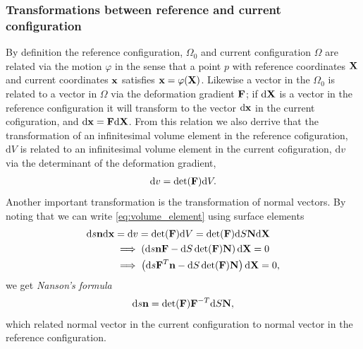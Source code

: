 \subsubsection{Transformations between reference and current
  configuration}
By definition the reference configuration, $\Omega_0$ and current
configuration $\Omega$ are related via the motion $\varphi$ in the
sense that a point $p$ with reference coordinates $\mathbf{X}$ and current
coordinates $\mathbf{x}$ satisfies $\mathbf{x} = \varphi(\mathbf{X})$. Likewise a
vector in the $\Omega_0$ is related to a vector in $\Omega$ via the
deformation gradient $\mathbf{F}$; if $\mathrm{d}\mathbf{X}$ is a vector in the
reference configuration it will transform to the vector
$\mathrm{d}\mathbf{x}$ in the current cofiguration, and $\mathrm{d}\mathbf{x} =
\mathbf{F} \mathrm{d}\mathbf{X}$. From this relation we also derrive that the
transformation of an infinitesimal volume element in the reference
cofiguration, $\mathrm{d}V$ is related to an infinitesimal volume
element in the current cofiguration, $\mathrm{d}v$  via the determinant of the
deformation gradient,
\begin{align}
  \mathrm{d}v =\det(\mathbf{F}) \mathrm{d}V.
  \label{eq:volume_element}
\end{align}
Another important transformation is the transformation of normal
vectors. By noting that we can write \eqref{eq:volume_element} using
surface elements
\begin{align*}
  \mathrm{d}s \mathbf{n} \mathrm{d}\mathbf{x}  &= \mathrm{d}v = \det(\mathbf{F}) \mathrm{d}V = \det(\mathbf{F}) \mathrm{d}S  \mathbf{N} \mathrm{d}\mathbf{X}\\
  &\implies \left( \mathrm{d}s \mathbf{n} \mathbf{F}  - \mathrm{d}S \det(\mathbf{F}) \mathbf{N} \right) \mathrm{d}\mathbf{X} = 0\\
  &\implies \left( \mathrm{d}s \mathbf{F}^T \mathbf{n}  - \mathrm{d}S \det(\mathbf{F}) \mathbf{N} \right) \mathrm{d}\mathbf{X} = 0,\\
\end{align*}
we get \emph{Nanson's formula}
\begin{align}
  \mathrm{d}s \mathbf{n}  =  \det(\mathbf{F}) \mathbf{F}^{-T} \mathrm{d}S \mathbf{N},
\end{align}
which related normal vector in the current configuration to normal
vector in the reference configuration.


